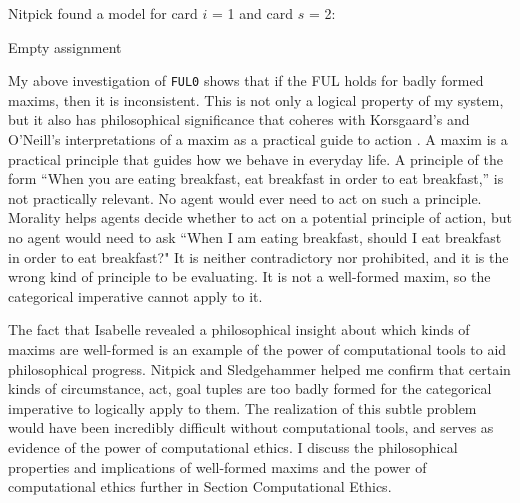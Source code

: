 \begin{isabellebody}
{\color{blue} Nitpick found a model for card $i$ = 1 and card $s$ = 2:

  Empty assignment \color{black}%
}%
\endisatagproof
{\isafoldproof}%
%
\isadelimproof
%
\endisadelimproof
%
\begin{isamarkuptext}%
My above investigation of \texttt{FUL0} shows that if the FUL holds for badly formed maxims, then 
it is inconsistent. This is not only a logical property of my system, but it also has philosophical
significance that coheres with Korsgaard's and O'Neill's interpretations of a maxim as a practical
guide to action \citep{actingforareason,actingonprinciple}. A maxim is a practical principle that guides how we behave in everyday life. A 
principle of the form ``When you are eating breakfast, eat breakfast in order to eat breakfast,'' is not 
practically relevant. No agent would ever need to act on such a principle. Morality helps agents decide
whether to act on a potential principle of action, but no agent would need to ask
``When I am eating breakfast, should I eat breakfast in order to eat breakfast?" It is neither contradictory
nor prohibited, and it is the wrong kind of principle to be evaluating. It is not a
well-formed maxim, so the categorical imperative cannot apply to it. 

The fact that Isabelle revealed a philosophical insight about which kinds of maxims are well-formed
is an example of the power of computational tools to aid
philosophical progress. Nitpick and Sledgehammer helped me confirm that certain kinds
of circumstance, act, goal tuples are too badly formed for the categorical imperative to logically 
apply to them. The realization of this subtle problem would have been incredibly difficult without 
computational tools, and serves as evidence of the power of computational ethics. I discuss the philosophical
properties and implications of well-formed maxims and the power of computational ethics further in 
Section Computational Ethics.


\end{isamarkuptext}
\end{isabellebody}
